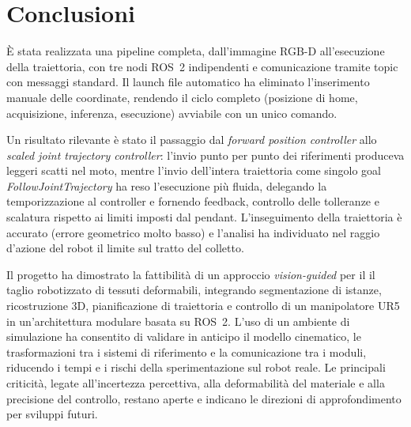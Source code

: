 \section{Conclusioni}

È stata realizzata una pipeline completa, dall'immagine RGB-D
all'esecuzione della traiettoria, con tre nodi ROS~2 indipendenti e
comunicazione tramite topic con messaggi standard. Il launch file
automatico ha eliminato l'inserimento manuale delle coordinate, rendendo
il ciclo completo (posizione di home, acquisizione, inferenza, esecuzione)
avviabile con un unico comando.

Un risultato rilevante è stato il passaggio dal \textit{forward position
    controller} allo \textit{scaled joint trajectory controller}: l'invio punto
per punto dei riferimenti produceva leggeri scatti nel moto, mentre l'invio
dell'intera traiettoria come singolo goal \textit{FollowJointTrajectory} ha
reso l'esecuzione più fluida, delegando la temporizzazione al controller e
fornendo feedback, controllo delle tolleranze e scalatura rispetto ai limiti
imposti dal pendant. L'inseguimento della traiettoria è accurato (errore
geometrico molto basso) e l'analisi ha individuato nel raggio d'azione del
robot il limite sul tratto del colletto.

Il progetto ha dimostrato la fattibilità di un approccio
\textit{vision-guided} per il il taglio robotizzato di tessuti deformabili, integrando segmentazione di istanze, ricostruzione 3D,
pianificazione di traiettoria e controllo di un manipolatore UR5 in
un'architettura modulare basata su ROS~2. L'uso di un ambiente di
simulazione ha consentito di validare in anticipo il modello cinematico, le
trasformazioni tra i sistemi di riferimento e la comunicazione tra i
moduli, riducendo i tempi e i rischi della sperimentazione sul robot
reale. Le principali criticità, legate all'incertezza percettiva, alla
deformabilità del materiale e alla precisione del controllo, restano
aperte e indicano le direzioni di approfondimento per sviluppi futuri.